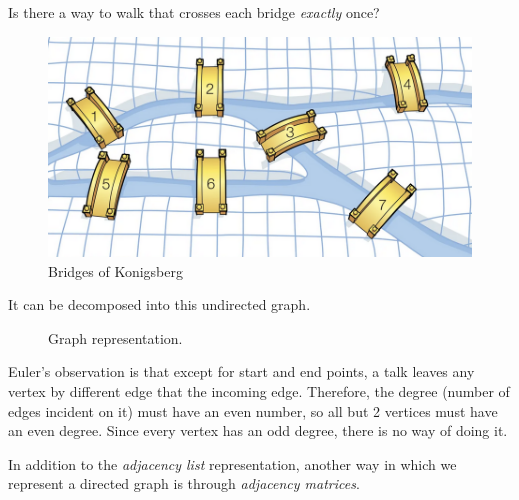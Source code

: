 \documentclass{article}
\begin{document}
    \begin{example}
      Is there a way to walk that crosses each bridge \textit{exactly} once? 
      \begin{figure}[H]
        \centering 
        \includegraphics[scale=0.4]{img/bridges.png}
        \caption{Bridges of Konigsberg} 
        \label{fig:bridges}
      \end{figure}
      It can be decomposed into this undirected graph. 
      \begin{figure}[H]
        \centering 
        \caption{Graph representation. } 
        \label{fig:bridge_graph}
      \end{figure}
      Euler's observation is that except for start and end points, a talk leaves any vertex by different edge that the incoming edge. Therefore, the degree (number of edges incident on it) must have an even number, so all but 2 vertices must have an even degree. Since every vertex has an odd degree, there is no way of doing it. 
    \end{example}

    In addition to the \textit{adjacency list} representation, another way in which we represent a directed graph is through \textit{adjacency matrices}. 
\end{document}
